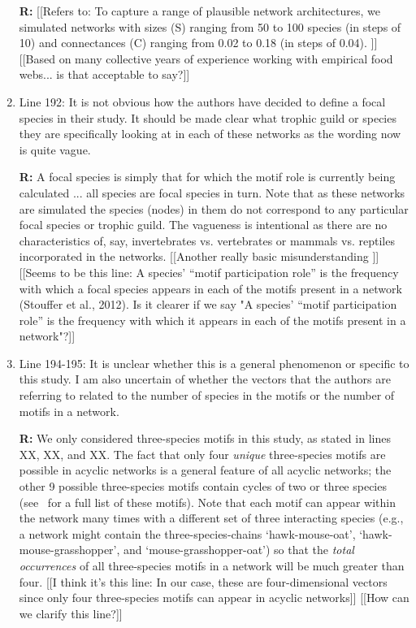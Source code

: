 \documentclass[12pt]{article}
\begin{document}
\begin{enumerate}
                \textbf{R:} [[Refers to: To capture a range of plausible network architectures, we simulated networks with sizes (S) ranging from 50 to 100 species (in steps of 10) and connectances (C) ranging from 0.02 to 0.18 (in steps of 0.04). ]] [[Based on many collective years of experience working with empirical food webs... is that acceptable to say?]]


            \item Line 192: It is not obvious how the authors have decided to define a focal species in their study. It should be made clear what trophic guild or species they are specifically looking at in each of these networks as the wording now is quite vague.

                \textbf{R:} A focal species is simply that for which the motif role is currently being calculated ... all species are focal species in turn. Note that as these networks are simulated the species (nodes) in them do not correspond to any particular focal species or trophic guild. The vagueness is intentional as there are no characteristics of, say, invertebrates vs. vertebrates or mammals vs. reptiles incorporated in the networks. [[Another really basic misunderstanding ]][[Seems to be this line: A species’ ``motif participation role'' is the frequency with which a focal species appears in each of the motifs present in a network (Stouffer et al., 2012). Is it clearer if we say "A species’ ``motif participation role'' is the frequency with which it appears in each of the motifs present in a network"?]]


            \item Line 194-195: It is unclear whether this is a general phenomenon or specific to this study. I am also uncertain of whether the vectors that the authors are referring to related to the number of species in the motifs or the number of motifs in a network.

                \textbf{R:} We only considered three-species motifs in this study, as stated in lines XX, XX, and XX. The fact that only four \emph{unique} three-species motifs are possible in acyclic networks is a general feature of all acyclic networks; the other 9 possible three-species motifs contain cycles of two or three species (see~\citep{Stouffer2007} for a full list of these motifs). Note that each motif can appear within the network many times with a different set of three interacting species (e.g., a network might contain the three-species-chains `hawk-mouse-oat',  `hawk-mouse-grasshopper', and `mouse-grasshopper-oat') so that the \emph{total occurrences} of all three-species motifs in a network will be much greater than four.
                [[I think it's this line: In our case, these are four-dimensional vectors since only four three-species motifs can appear in acyclic networks]]
                [[How can we clarify this line?]]



\end{enumerate}
\end{document}
